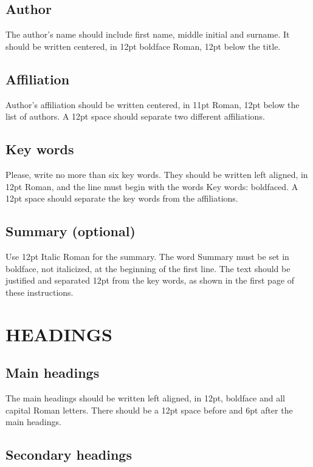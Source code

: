 \documentclass{nordic}
\begin{document}
\subsection{Author}

The author's name should include first name, middle initial and
surname. It should be written centered, in 12pt boldface Roman,
12pt below the title.

\subsection{Affiliation}

Author's affiliation should be written centered, in 11pt Roman,
12pt below the list of authors. A 12pt space should separate two
different affiliations.

\subsection{Key words}

Please, write no more than six key words. They should be written
left aligned, in 12pt Roman, and the line must begin with the
words Key words: boldfaced. A 12pt space should separate the key
words from the affiliations.

\subsection {Summary (optional)}

Use 12pt Italic Roman for the summary. The word Summary must be
set in boldface, not italicized, at the beginning of the first
line. The text should be justified and separated 12pt from the key
words, as shown in the first page of these instructions.

\section{HEADINGS}

\subsection{Main headings}

The main headings should be written left aligned, in 12pt,
boldface and all capital Roman letters. There should be a 12pt
space before and 6pt after the main headings.

\subsection {Secondary headings}
\end{document}
